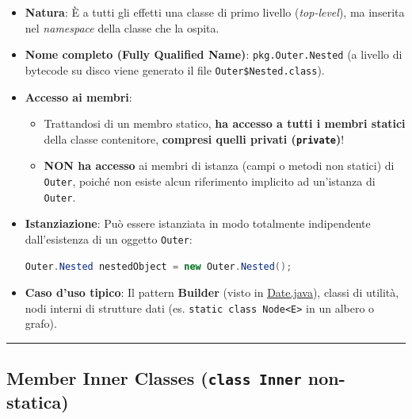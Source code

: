 \documentclass[11pt,a4paper,oneside]{report}
\newcommand{\passthrough}[1]{#1}
\providecommand{\tightlist}{\setlength{\itemsep}{0pt}\setlength{\parskip}{0pt}}
\begin{document}
\begin{itemize}
\item
  \textbf{Natura}: È a tutti gli effetti una classe di primo livello
  (\emph{top-level}), ma inserita nel \emph{namespace} della classe che
  la ospita.
\item
  \textbf{Nome completo (Fully Qualified Name)}:
  \passthrough{\lstinline!pkg.Outer.Nested!} (a livello di bytecode su
  disco viene generato il file
  \passthrough{\lstinline!Outer$Nested.class!}).
\item
  \textbf{Accesso ai membri}:

  \begin{itemize}
  \tightlist
  \item
    Trattandosi di un membro statico, \textbf{ha accesso a tutti i
    membri statici} della classe contenitore, \textbf{compresi quelli
    privati (\passthrough{\lstinline!private!})}!
  \item
    \textbf{NON ha accesso} ai membri di istanza (campi o metodi non
    statici) di \passthrough{\lstinline!Outer!}, poiché non esiste alcun
    riferimento implicito ad un'istanza di
    \passthrough{\lstinline!Outer!}.
  \end{itemize}
\item
  \textbf{Istanziazione}: Può essere istanziata in modo totalmente
  indipendente dall'esistenza di un oggetto
  \passthrough{\lstinline!Outer!}:

\begin{lstlisting}[language=Java]
Outer.Nested nestedObject = new Outer.Nested();
\end{lstlisting}
\item
  \textbf{Caso d'uso tipico}: Il pattern \textbf{Builder} (visto in
  \href{file:///home/wally/Documenti/GitHub/Programmazione-II/25-26/Teoria-e-Esercitazioni/Codice-20260902/Lezione14/MavenDate/src/main/java/it/oop/core/Date.java\#L85-L106}{Date.java}),
  classi di utilità, nodi interni di strutture dati (es.
  \passthrough{\lstinline!static class Node<E>!} in un albero o grafo).
\end{itemize}

\begin{center}\rule{0.5\linewidth}{0.5pt}\end{center}

\subsection{\texorpdfstring{Member Inner Classes (\texttt{class\ Inner}
non-statica)}{Member Inner Classes (class Inner non-statica)}}\label{chap13_member-inner-classes-class-inner-non-statica}
\end{document}
